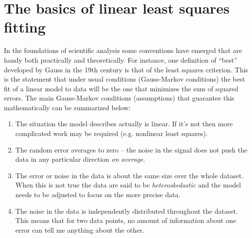 \section{The basics of linear least squares fitting}
In the foundations of scientific analysis some conventions have emerged that are handy both practically and theoretically. For instance, one definition of ``best'' developed by Gauss in the 19th century is that of the least squares criterion. This is the statement that under usual conditions (Gauss-Markov conditions) the best fit of a linear model to data will be the one that minimizes the sum of squared errors. The main Gauss-Markov conditions (assumptions) that guarantee this mathematically can be summarized below:
\begin{enumerate}
\item The situation the model describes actually is linear. If it's not then more complicated work may be required (e.g. nonlinear least squares).
\item The random error averages to zero -- the noise in the signal does not push the data in any particular direction \emph{on average}.
\item The error or noise in the data is about the same size over the whole dataset. When this is not true the data are said to be \emph{heteroskedastic} and the model needs to be adjusted to focus on the more precise data.
\item The noise in the data is independently distributed throughout the dataset. This means that for two data points, no amount of information about one error can tell me anything about the other.
\end{enumerate}

